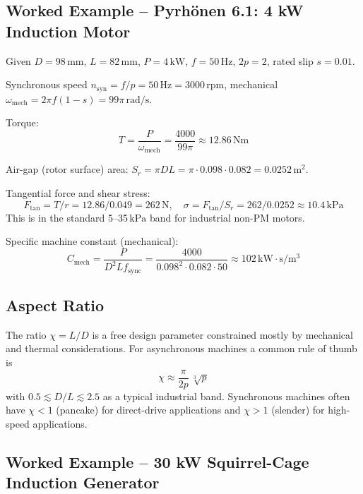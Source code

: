 \documentclass[12pt,a4paper]{article}
\newcommand{\unit}[1]{\ensuremath{\,\mathrm{#1}}}
\begin{document}
\subsection{Worked Example -- Pyrh\"onen 6.1: 4 kW Induction Motor}

Given $D=98\unit{mm}$, $L=82\unit{mm}$, $P = 4\unit{kW}$,
$f=50\unit{Hz}$, $2p=2$, rated slip $s=0.01$.

Synchronous speed $n_\text{syn} = f/p = 50\unit{Hz} = 3000\unit{rpm}$,
mechanical $\omega_\text{mech} = 2\pi f(1-s) = 99\pi\unit{rad/s}$.

Torque:
\begin{equation}
  T = \frac{P}{\omega_\text{mech}} = \frac{4000}{99\pi} \approx 12.86\unit{Nm}
\end{equation}

Air-gap (rotor surface) area:
$S_r = \pi D L = \pi \cdot 0.098 \cdot 0.082 = 0.0252\unit{m^2}$.

Tangential force and shear stress:
\begin{equation}
  F_\text{tan} = T/r = 12.86/0.049 = 262\unit{N},
  \quad
  \sigma = F_\text{tan}/S_r = 262/0.0252 \approx 10.4\unit{kPa}
\end{equation}
This is in the standard 5--35\unit{kPa} band for industrial
non-PM motors.

Specific machine constant (mechanical):
\begin{equation}
  C_\text{mech} = \frac{P}{D^2 L f_\text{sync}}
                = \frac{4000}{0.098^2\cdot 0.082\cdot 50}
                \approx 102\unit{kW\!\cdot\!s/m^3}
\end{equation}

\subsection{Aspect Ratio}

The ratio $\chi = L/D$ is a free design parameter constrained mostly
by mechanical and thermal considerations. For asynchronous machines a
common rule of thumb is
\begin{equation}
  \chi \approx \frac{\pi}{2p}\,\sqrt[3]{p}
\end{equation}
with $0.5 \lesssim D/L \lesssim 2.5$ as a typical industrial band.
Synchronous machines often have $\chi < 1$ (pancake) for direct-drive
applications and $\chi > 1$ (slender) for high-speed applications.

\subsection{Worked Example -- 30 kW Squirrel-Cage Induction Generator}
\end{document}
